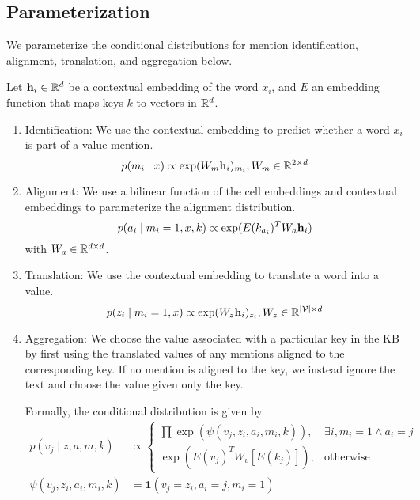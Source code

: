 \documentclass[12pt]{article}
\begin{document}
\subsection{Parameterization}
We parameterize the conditional distributions for
mention identification, alignment, translation, and aggregation below.

Let $\mathbf{h}_i \in \mathbb{R}^d$ be a contextual embedding of the word $x_i$,
and $E$ an embedding function that maps keys $k$ to vectors in $\mathbb{R}^{d}$.
\begin{enumerate}
\item Identification: We use the contextual embedding to  predict
whether a word $x_i$ is part of a value mention.
\begin{equation}
p(m_i \mid x) \propto \exp(W_m\mathbf{h}_i)_{m_i}, W_m \in \mathbb{R}^{2 \times d}
\end{equation}
\item Alignment: We use a bilinear function of the cell embeddings and
contextual embeddings to parameterize the alignment distribution.
\begin{equation}
p(a_i \mid m_i=1,x,k) \propto \exp(E(k_{a_i})^T W_a \mathbf{h}_i)\\
\end{equation}
with $W_a \in \mathbb{R}^{d \times d}$.
\item Translation: We use the contextual embedding to translate a word
into a value. 
\begin{equation}
p(z_i \mid m_i=1,x) \propto \exp(W_z \mathbf{h}_i)_{z_i}, W_z \in \mathbb{R}^{|\mathcal{V}| \times d}
\end{equation}
\item Aggregation:
We choose the value associated with a particular key in the KB
by first using the translated values of any mentions aligned to the
corresponding key.
If no mention is aligned to the key, we instead ignore the text and 
choose the value given only the key.

Formally, the conditional distribution is given by
\begin{align}
p(v_j \mid z,a,m,k) &\propto \begin{cases}
    \prod \exp(\psi(v_j, z_i,a_i,m_i,k)),  & \exists i, m_i = 1 \wedge a_i = j\\
    \exp(E(v_j)^TW_v [E(k_j)]), & \textrm{otherwise}
\end{cases}\\
\psi(v_j, z_i, a_i, m_i,k) &= \mathbf{1}(v_j = z_i, a_i = j, m_i=1)%
\end{align}
\end{enumerate}
\end{document}
